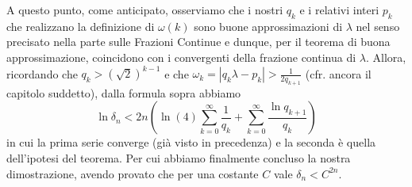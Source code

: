 A questo punto, come anticipato, osserviamo che i nostri $q_k$ e i relativi interi $p_k$ che realizzano la definizione di $\omega(k)$
sono buone approssimazioni di $\lambda$ nel senso precisato nella parte sulle Frazioni Continue e dunque, per il teorema di buona approssimazione,
coincidono con i convergenti della frazione continua di $\lambda$. 
Allora, ricordando che $q_k>(\sqrt{2})^{k-1}$ e che $\omega_k=|q_k\lambda-p_k|>\frac{1}{2q_{k+1}}$ (cfr. ancora il capitolo suddetto), dalla formula sopra abbiamo
\[\ln\delta_n <2n\left(\ln(4)\sum_{k=0}^\infty \frac{1}{q_k}+\sum_{k=0}^\infty \frac{\ln q_{k+1}}{q_k} \right)\]
in cui la prima serie converge (già visto in precedenza) e la seconda è quella dell'ipotesi del teorema. 
Per cui abbiamo finalmente concluso la nostra dimostrazione, avendo provato che per una costante $C$ vale $\delta_n<C^{2n}$.